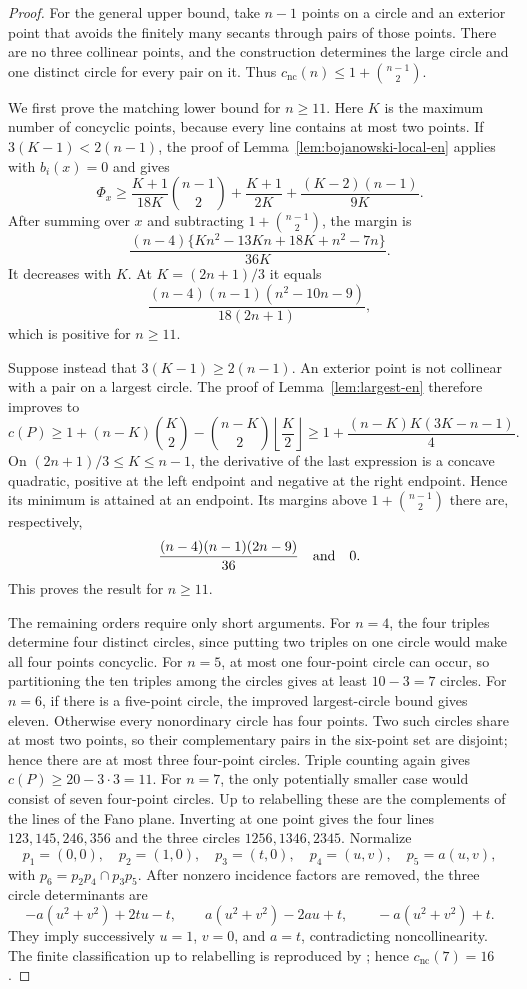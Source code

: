 \documentclass[11pt,a4paper]{article}
\theoremstyle{definition}
\newcommand{\file}[1]{\path{#1}}
\begin{document}
\begin{proof}
For the general upper bound, take $n-1$ points on a circle and an exterior
point that avoids the finitely many secants through pairs of those points.
There are no three collinear points, and the construction determines the
large circle and one distinct circle for every pair on it.  Thus
$c_{\mathrm{nc}}(n)\le1+\binom{n-1}{2}$.

We first prove the matching lower bound for $n\ge11$.  Here $K$ is the maximum
number of concyclic points, because every line contains at most two points.
If $3(K-1)<2(n-1)$, the proof of
Lemma~\ref{lem:bojanowski-local-en} applies with $b_i(x)=0$ and gives
\[
 \Phi_x\ge
 \frac{K+1}{18K}\binom{n-1}{2}
 +\frac{K+1}{2K}+\frac{(K-2)(n-1)}{9K}.
\]
After summing over $x$ and subtracting $1+\binom{n-1}{2}$, the margin is
\[
 \frac{(n-4)\{Kn^2-13Kn+18K+n^2-7n\}}{36K}.
\]
It decreases with $K$.  At $K=(2n+1)/3$ it equals
\[
 \frac{(n-4)(n-1)(n^2-10n-9)}{18(2n+1)},
\]
which is positive for $n\ge11$.

Suppose instead that $3(K-1)\ge2(n-1)$.  An exterior point is not collinear
with a pair on a largest circle.  The proof of Lemma~\ref{lem:largest-en}
therefore improves to
\[
 c(P)\ge1+(n-K)\binom K2-\binom{n-K}{2}\left\lfloor\frac K2\right\rfloor
 \ge1+\frac{(n-K)K(3K-n-1)}4.
\]
On $(2n+1)/3\le K\le n-1$, the derivative of the last expression is a
concave quadratic, positive at the left endpoint and negative at the right
endpoint.  Hence its minimum is attained at an endpoint.  Its margins above
$1+\binom{n-1}{2}$ there are, respectively,
\[
 \frac{(n-4)(n-1)(2n-9)}{36}\quad\hbox{and}\quad0.
\]
This proves the result for $n\ge11$.

  The remaining orders require only short arguments.  For $n=4$, the four
  triples determine four distinct circles, since putting two triples on one
  circle would make all four points concyclic.  For $n=5$, at most one
  four-point circle can occur, so partitioning the ten triples among the
  circles gives at least $10-3=7$ circles.  For $n=6$, if there is a
  five-point circle, the improved largest-circle bound gives eleven.  Otherwise
  every nonordinary circle has four points.  Two such circles share at most two
  points, so their complementary pairs in the six-point set are disjoint;
  hence there are at most three four-point circles.  Triple counting again
  gives $c(P)\ge20-3\cdot3=11$.  For $n=7$, the only potentially
smaller case would consist of seven four-point circles.  Up to relabelling
these are the complements of the lines of the Fano plane.  Inverting at one
point gives the four lines $123,145,246,356$ and the three circles
$1256,1346,2345$.  Normalize
\[
 p_1=(0,0),\quad p_2=(1,0),\quad p_3=(t,0),\quad
 p_4=(u,v),\quad p_5=a(u,v),
\]
with $p_6=p_2p_4\cap p_3p_5$.  After nonzero incidence factors are removed,
the three circle determinants are
\[
 -a(u^2+v^2)+2tu-t,\qquad
 a(u^2+v^2)-2au+t,\qquad
 -a(u^2+v^2)+t.
\]
They imply successively $u=1$, $v=0$, and $a=t$, contradicting
noncollinearity.  The finite classification up to relabelling is reproduced by
\file{computation/no_three_collinear/verify_no_three_collinear.py}; hence
$c_{\mathrm{nc}}(7)=16$.


\end{proof}
\end{document}
